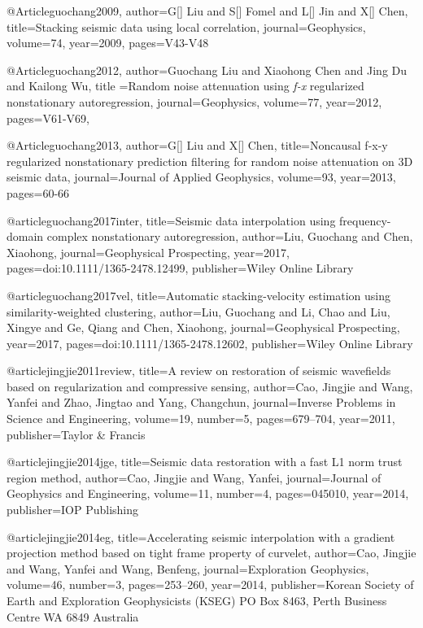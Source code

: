 @Article{guochang2009,
author={G[] Liu and S[] Fomel and L[] Jin and X[] Chen},
title={Stacking seismic data using local correlation},
journal={Geophysics},
volume=74,
year=2009,
pages={V43-V48}
}

@Article{guochang2012,
  author={Guochang Liu and Xiaohong Chen and Jing Du and Kailong Wu},
  title ={Random noise attenuation using \emph{f-x} regularized nonstationary autoregression},
  journal={Geophysics},
  volume=77,
  year=2012,
  pages={V61-V69},
}

@Article{guochang2013,
author={G[] Liu and X[] Chen},
title={Noncausal f-x-y regularized nonstationary prediction filtering for random noise attenuation on 3{D} seismic data},
journal={Journal of Applied Geophysics},
volume=93,
year=2013,
pages={60-66}
}

@article{guochang2017inter,
  title={Seismic data interpolation using frequency-domain complex nonstationary autoregression},
  author={Liu, Guochang and Chen, Xiaohong},
  journal={Geophysical Prospecting},
  year={2017},
  pages={doi:10.1111/1365-2478.12499},
  publisher={Wiley Online Library}
}

@article{guochang2017vel,
  title={Automatic stacking-velocity estimation using similarity-weighted clustering},
  author={Liu, Guochang and Li, Chao and Liu, Xingye and Ge, Qiang and Chen, Xiaohong},
  journal={Geophysical Prospecting},
  year={2017},
  pages={doi:10.1111/1365-2478.12602},
  publisher={Wiley Online Library}
}

@article{jingjie2011review,
  title={A review on restoration of seismic wavefields based on regularization and compressive sensing},
  author={Cao, Jingjie and Wang, Yanfei and Zhao, Jingtao and Yang, Changchun},
  journal={Inverse Problems in Science and Engineering},
  volume={19},
  number={5},
  pages={679--704},
  year={2011},
  publisher={Taylor \& Francis}
}

@article{jingjie2014jge,
  title={Seismic data restoration with a fast L1 norm trust region method},
  author={Cao, Jingjie and Wang, Yanfei},
  journal={Journal of Geophysics and Engineering},
  volume={11},
  number={4},
  pages={045010},
  year={2014},
  publisher={IOP Publishing}
}

@article{jingjie2014eg,
  title={Accelerating seismic interpolation with a gradient projection method based on tight frame property of curvelet},
  author={Cao, Jingjie and Wang, Yanfei and Wang, Benfeng},
  journal={Exploration Geophysics},
  volume={46},
  number={3},
  pages={253--260},
  year={2014},
  publisher={Korean Society of Earth and Exploration Geophysicists (KSEG) PO Box 8463, Perth Business Centre WA 6849 Australia}
}

